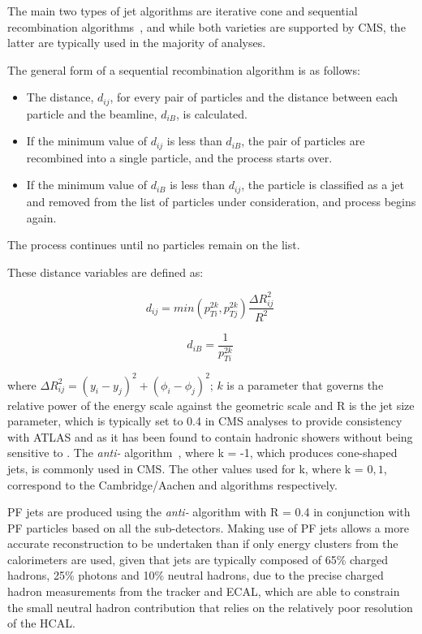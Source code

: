 The main two types of jet algorithms are iterative cone and sequential recombination algorithms~\cite{Salam:2009jx}, and while both varieties are supported by CMS, the latter are typically used in the majority of analyses.

The general form of a sequential recombination algorithm is as follows:
\begin{itemize}
\item The distance, $d_{ij}$, for every pair of particles and the distance between each particle and the beamline, $d_{iB}$, is calculated.
\item If the minimum value of $d_{ij}$ is less than $d_{iB}$, the pair of particles are recombined into a single particle, and the process starts over.
\item If the minimum value of $d_{iB}$ is less than $d_{ij}$, the particle is classified as a jet and removed from the list of particles under consideration, and process begins again.
\end{itemize}

The process continues until no particles remain on the list.

These distance variables are defined as:

\begin{equation}
d_{ij} = min(p^{2k}_{Ti},p^{2k}_{Tj}) \frac{\Delta R^{2}_{ij}}{R^{2}} \;
\label{eq:jetAlgo1}
\end{equation}

\begin{equation}
d_{iB} = \frac{1}{p^{2k}_{Ti}} \;
\label{eq:jetAlgo2}
\end{equation}

where $\Delta R^{2}_{ij} = (y_{i} - y_{j})^{2} + (\phi_{i} - \phi_{j})^{2}$; $k$  is a parameter that governs the relative power of the energy scale against the geometric scale and R is the jet size parameter, which is typically set to 0.4 in CMS analyses to provide consistency with ATLAS and as it has been found to contain hadronic showers without being sensitive to \PU.
The \emph{anti-\kt} algorithm~\cite{Cacciari:2008gp}, where k = -1, which produces cone-shaped jets, is commonly used in CMS.
The other values used for k, where k = $0,1$, correspond to the Cambridge/Aachen and \kt algorithms respectively.

PF jets are produced using the \emph{anti-\kt} algorithm with R = 0.4 in conjunction with PF particles based on all the sub-detectors.
Making use of PF jets allows a more accurate reconstruction to be undertaken than if only energy clusters from the calorimeters are used, given that jets are typically composed of 65\% charged hadrons, 25\% photons and 10\% neutral hadrons, due to the precise charged hadron measurements from the tracker and ECAL, which are able to constrain the small neutral hadron contribution that relies on the relatively poor resolution of the HCAL.	

